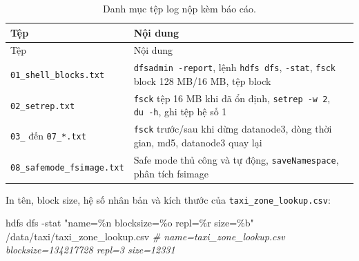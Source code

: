 \documentclass[
  12pt,
  a4paper,
]{article}
\newenvironment{Shaded}{}{}
\newcommand{\AttributeTok}[1]{\textcolor[rgb]{0.49,0.56,0.16}{#1}}
\newcommand{\CommentTok}[1]{\textcolor[rgb]{0.38,0.63,0.69}{\textit{#1}}}
\newcommand{\ExtensionTok}[1]{#1}
\newcommand{\NormalTok}[1]{#1}
\newcommand{\StringTok}[1]{\textcolor[rgb]{0.25,0.44,0.63}{#1}}
\begin{document}
\begin{longtable}[]{@{}
  >{\raggedright\arraybackslash}p{}
  >{\raggedright\arraybackslash}p{}@{}}
\caption{\label{tbl:l01-files}Danh mục tệp log nộp kèm báo
cáo.}\tabularnewline
\toprule\noalign{}
\begin{minipage}[b]{\linewidth}\raggedright
Tệp
\end{minipage} & \begin{minipage}[b]{\linewidth}\raggedright
Nội dung
\end{minipage} \\
\midrule\noalign{}
\endfirsthead
\toprule\noalign{}
\begin{minipage}[b]{\linewidth}\raggedright
Tệp
\end{minipage} & \begin{minipage}[b]{\linewidth}\raggedright
Nội dung
\end{minipage} \\
\midrule\noalign{}
\endhead
\bottomrule\noalign{}
\endlastfoot
\texttt{01\_}\allowbreak{}\texttt{shell\_}\allowbreak{}\texttt{blocks.}\allowbreak{}\texttt{txt}\allowbreak{}
& \texttt{dfsadmin\ -report}\allowbreak{}, lệnh \texttt{hdfs\ dfs},
\texttt{-stat}, \texttt{fsck} block 128 MB/16 MB, tệp block \\
\texttt{02\_setrep.txt} & \texttt{fsck} tệp 16 MB khi đã ổn định,
\texttt{setrep\ -w\ 2}, \texttt{du\ -h}, ghi tệp hệ số 1 \\
\texttt{03\_} đến \texttt{07\_*.txt} & \texttt{fsck} trước/sau khi dừng
datanode3, dòng thời gian, md5, datanode3 quay lại \\
\texttt{08\_}\allowbreak{}\texttt{safemode\_}\allowbreak{}\texttt{fsimage.}\allowbreak{}\texttt{txt}\allowbreak{}
& Safe mode thủ công và tự động, \texttt{saveNamespace}, phân tích
fsimage \\
\end{longtable}

In tên, block size, hệ số nhân bản và kích thước của
\texttt{taxi\_}\allowbreak{}\texttt{zone\_}\allowbreak{}\texttt{lookup.}\allowbreak{}\texttt{csv}\allowbreak{}:

\begin{Shaded}
\begin{Highlighting}[]
\ExtensionTok{hdfs}\NormalTok{ dfs }\AttributeTok{{-}stat} \StringTok{"name=\%n blocksize=\%o repl=\%r size=\%b"}\NormalTok{ /data/taxi/taxi\_zone\_lookup.csv}
\CommentTok{\# name=taxi\_zone\_lookup.csv blocksize=134217728 repl=3 size=12331}
\end{Highlighting}
\end{Shaded}
\end{document}
